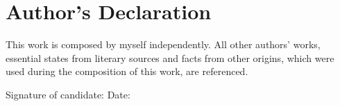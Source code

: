 \clearpage\vspace*{\fill}

\section*{Author's Declaration} 


This work is composed by myself independently. All other authors' works, essential
states from literary sources and facts from other origins, which were used during the
composition of this work, are referenced.

\vspace{7em}
Signature of candidate: \hspace{10em}Date:

\vspace{\fill}
\clearpage


